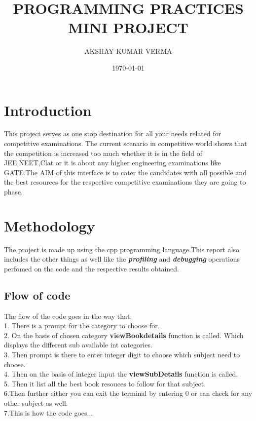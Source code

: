 \documentclass{article}
\begin{document}
\title{\textbf{PROGRAMMING PRACTICES \\
MINI PROJECT}}
\author{AKSHAY KUMAR VERMA}
\date{\today}

\maketitle

\newpage %
\section{Introduction}
This project serves as one stop destination for all your needs related for competitive examinations. The current scenario in competitive world shows that the competition is increased too much whether it is in the field of JEE,NEET,Clat or it is about any higher engineering examinations like GATE.The AIM of this interface is to cater the candidates with all possible and the best resources for the respective competitive examinations they are going to phase. 

\section{Methodology}
The project is made up using the cpp programming language.This report also includes the other things as well like the\textit{ \textbf{profiling} }and \textit{\textbf{debugging}} operations perfomed on the code and the respective results obtained. 
\subsection{Flow of code}
 The flow of the code goes in the way that:\\
 1. There is a prompt for the category to choose for.\\
 2. On the basis of chosen category \textbf{viewBookdetails} function is called. Which displays the different sub available int categories.\\
 3. Then prompt is there to enter integer digit to choose which subject need to choose.\\
 4. Then on the basis of integer input the \textbf{viewSubDetails} function is called.\\
 5. Then it list all the best book resouces to follow for that subject.\\
 6.Then further either you can exit the terminal by entering 0 or can check for any other subject as well.\\
 7.This is how the code goes...\\
\end{document}
